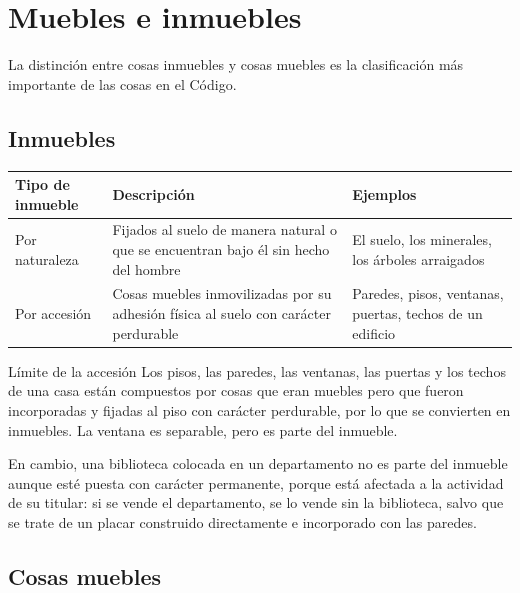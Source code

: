 \documentclass[12pt,oneside]{book}
\newenvironment{tabla}{%
    \par\medskip\begingroup\small\renewcommand{\arraystretch}{1.3}\noindent\ignorespaces
}{%
    \par\endgroup\medskip
}
\begin{document}
\section{Muebles e inmuebles}

La distinción entre cosas inmuebles y cosas muebles es la clasificación más importante de las cosas en el Código.

\subsection{Inmuebles}

\begin{tabla}
\begin{tabularx}{\textwidth}{B{2.8cm}YY}
\toprule
Tipo de inmueble & \textbf{Descripción} & \textbf{Ejemplos} \\
\midrule
Por naturaleza & Fijados al suelo de manera natural o que se encuentran bajo él sin hecho del hombre & El suelo, los minerales, los árboles arraigados \\
Por accesión & Cosas muebles inmovilizadas por su adhesión física al suelo con carácter perdurable & Paredes, pisos, ventanas, puertas, techos de un edificio \\
\bottomrule
\end{tabularx}
\end{tabla}

\begin{example}{Límite de la accesión}
Los pisos, las paredes, las ventanas, las puertas y los techos de una casa están compuestos por cosas que eran muebles pero que fueron incorporadas y fijadas al piso con carácter perdurable, por lo que se convierten en inmuebles. La ventana es separable, pero es parte del inmueble.

En cambio, una biblioteca colocada en un departamento no es parte del inmueble aunque esté puesta con carácter permanente, porque está afectada a la actividad de su titular: si se vende el departamento, se lo vende sin la biblioteca, salvo que se trate de un placar construido directamente e incorporado con las paredes.
\end{example}

\subsection{Cosas muebles}
\end{document}
